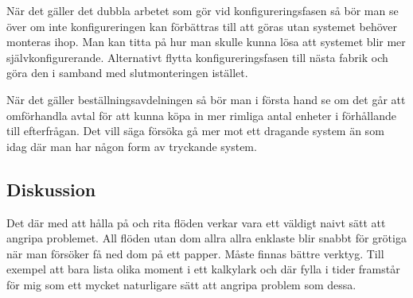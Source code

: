 \documentclass{article}
\begin{document}
När det gäller det dubbla arbetet som gör vid konfigureringsfasen så bör man se över om inte konfigureringen kan förbättras till att göras utan systemet behöver monteras ihop. Man kan titta på hur man skulle kunna lösa att systemet blir mer självkonfigurerande. Alternativt flytta konfigureringsfasen till nästa fabrik och göra den i samband med slutmonteringen istället.

När det gäller beställningsavdelningen så bör man i första hand se om det går att omförhandla avtal för att kunna köpa in mer rimliga antal enheter i förhållande till efterfrågan. Det vill säga försöka gå mer mot ett dragande system än som idag där man har någon form av tryckande system.

\subsection*{Diskussion}
Det där med att hålla på och rita flöden verkar vara ett väldigt naivt sätt att angripa problemet. All flöden utan dom allra allra enklaste blir snabbt för grötiga när man försöker få ned dom på ett papper. Måste finnas bättre verktyg. Till exempel att bara lista olika moment i ett kalkylark och där fylla i tider framstår för mig som ett mycket naturligare sätt att angripa problem som dessa. 
\end{document}
